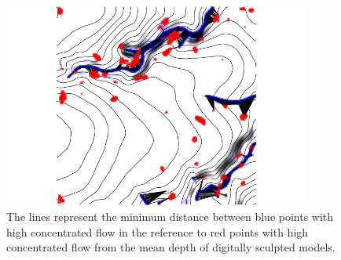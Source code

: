 \documentclass{isprs}
\begin{document}
%
%
%
\begin{figure}
\begin{center}
\includegraphics[width=0.9\textwidth]{figures/concentrated_flow_1.png}
\caption{
The lines represent the minimum distance between blue points with high concentrated flow in the reference to red points with high concentrated flow from the mean depth of digitally sculpted models.}
\label{fig:distance_1}
\end{center}
\end{figure}
%
\end{document}

